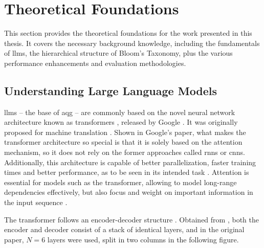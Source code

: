 \section{Theoretical Foundations} \label{sec:theoretical-foundations}

This section provides the theoretical foundations for the work presented in this thesis. It covers the necessary background knowledge, including the fundamentals of \ac{llms}, the hierarchical structure of Bloom's Taxonomy, plus the various performance enhancements and evaluation methodologies.

\subsection{Understanding Large Language Models}

 \ac{llms} -- the base of \ac{aqg} -- are commonly based on the novel neural network architecture known as transformers \cite{naik_large_2024}, released by Google \cite{vaswani_attention_2017}. It was originally proposed for machine translation \cite{minaee_large_2025,vaswani_attention_2017}. Shown in Google's paper, what makes the transformer architecture so special is that it is solely based on the attention mechanism, so it does not rely on the former approaches called \ac{rnns} or \ac{cnns}. Additionally, this architecture is capable of better parallelization, faster training times and better performance, as to be seen in its intended task \cite{vaswani_attention_2017}. Attention is essential for models such as the transformer, allowing to model long-range dependencies effectively, but also focus and weight on important information in the input sequence \cite{patil_review_2024}. 

The transformer follows an encoder-decoder structure \cite{patil_review_2024,minaee_large_2025}. Obtained from \cite{minaee_large_2025,vaswani_attention_2017}, both the encoder and decoder consist of a stack of identical layers, and in the original paper, $N=6$ layers were used, split in two columns in the following figure.

